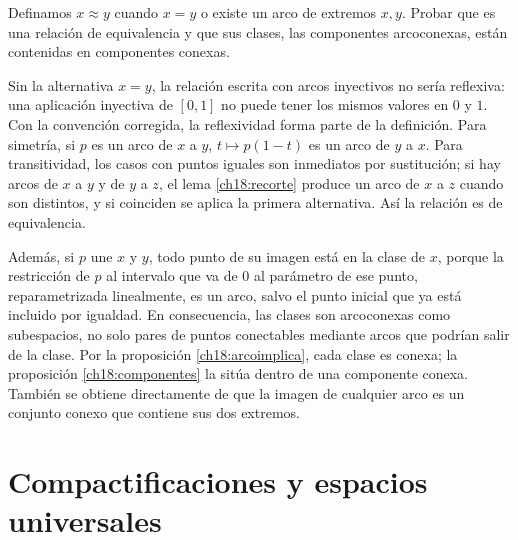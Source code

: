 \begin{ejercicio}\label{ej:lectura-18-7}
Definamos $x\approx y$ cuando $x=y$ o existe un arco de extremos $x,y$. Probar que es una relación de equivalencia y que sus clases, las componentes arcoconexas, están contenidas en componentes conexas.
\end{ejercicio}
\begin{solucion}
Sin la alternativa $x=y$, la relación escrita con arcos inyectivos no sería reflexiva: una aplicación inyectiva de $[0,1]$ no puede tener los mismos valores en $0$ y $1$. Con la convención corregida, la reflexividad forma parte de la definición. Para simetría, si $p$ es un arco de $x$ a $y$, $t\mapsto p(1-t)$ es un arco de $y$ a $x$. Para transitividad, los casos con puntos iguales son inmediatos por sustitución; si hay arcos de $x$ a $y$ y de $y$ a $z$, el lema \ref{ch18:recorte} produce un arco de $x$ a $z$ cuando son distintos, y si coinciden se aplica la primera alternativa. Así la relación es de equivalencia.

Además, si $p$ une $x$ y $y$, todo punto de su imagen está en la clase de $x$, porque la restricción de $p$ al intervalo que va de $0$ al parámetro de ese punto, reparametrizada linealmente, es un arco, salvo el punto inicial que ya está incluido por igualdad. En consecuencia, las clases son arcoconexas como subespacios, no solo pares de puntos conectables mediante arcos que podrían salir de la clase. Por la proposición \ref{ch18:arcoimplica}, cada clase es conexa; la proposición \ref{ch18:componentes} la sitúa dentro de una componente conexa. También se obtiene directamente de que la imagen de cualquier arco es un conjunto conexo que contiene sus dos extremos.
\end{solucion}

\chapter{Compactificaciones y espacios universales}

